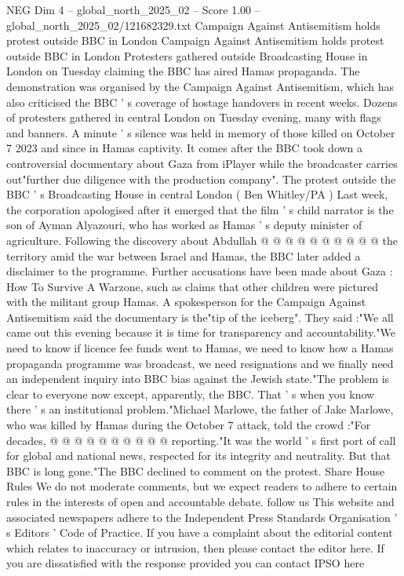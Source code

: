 \begin{textsample}{NEG Dim 4 – global\_north\_2025\_02 – Score 1.00 – global\_north\_2025\_02/121682329.txt}  \label{ex:f4_neg_408}
Campaign Against Antisemitism holds protest outside BBC in London Campaign Against Antisemitism holds protest outside BBC in London Protesters gathered outside Broadcasting House in London on Tuesday claiming the BBC has aired Hamas propaganda.
The demonstration was organised by the Campaign Against Antisemitism, which has also criticised the BBC ' s coverage of hostage handovers in recent weeks.
Dozens of protesters gathered in central London on Tuesday evening, many with flags and banners.
A minute ' s silence was held in memory of those killed on October 7 2023 and since in Hamas captivity.
It comes after the BBC took down a controversial documentary about Gaza from iPlayer while the broadcaster carries out"further due diligence with the production company".
The protest outside the BBC ' s Broadcasting House in central London ( Ben Whitley/PA ) Last week, the corporation apologised after it emerged that the film ' s child narrator is the son of Ayman Alyazouri, who has worked as Hamas ' s deputy minister of agriculture.
Following the discovery about Abdullah @ @ @ @ @ @ @ @ @ @ the territory amid the war between Israel and Hamas, the BBC later added a disclaimer to the programme.
Further accusations have been made about Gaza : How To Survive A Warzone, such as claims that other children were pictured with the militant group Hamas.
A spokesperson for the Campaign Against Antisemitism said the documentary is the"tip of the iceberg".
They said :"We all came out this evening because it is time for transparency and accountability."We need to know if licence fee funds went to Hamas, we need to know how a Hamas propaganda programme was broadcast, we need resignations and we finally need an independent inquiry into BBC bias against the Jewish state."The problem is clear to everyone now except, apparently, the BBC.
That ' s when you know there ' s an institutional problem."Michael Marlowe, the father of Jake Marlowe, who was killed by Hamas during the October 7 attack, told the crowd :"For decades, @ @ @ @ @ @ @ @ @ @ reporting."It was the world ' s first port of call for global and national news, respected for its integrity and neutrality.
But that BBC is long gone."The BBC declined to comment on the protest.
Share House Rules We do not moderate comments, but we expect readers to adhere to certain rules in the interests of open and accountable debate. follow us This website and associated newspapers adhere to the Independent Press Standards Organisation ' s Editors ' Code of Practice.
If you have a complaint about the editorial content which relates to inaccuracy or intrusion, then please contact the editor here.
If you are dissatisfied with the response provided you can contact IPSO here

\end{textsample}
